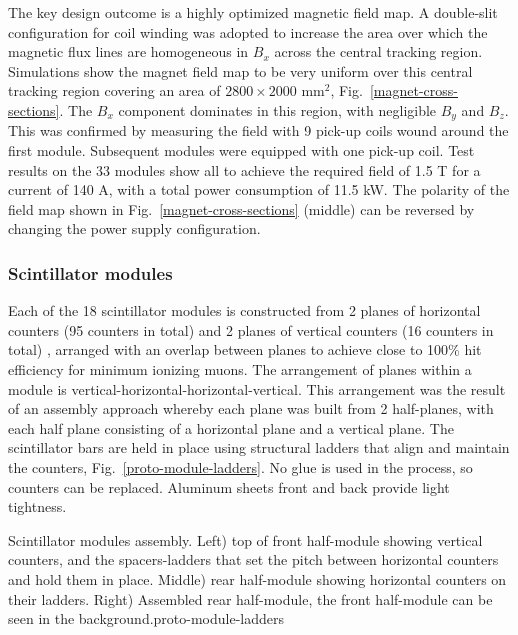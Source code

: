The key design outcome is a highly optimized magnetic field map. A double-slit configuration for coil winding was adopted to increase the area over which the magnetic flux lines are homogeneous in $B_x$ across the central tracking region. Simulations show the magnet field map to be very uniform over this central tracking region covering an area of $2800\times2000$ mm$^2$, Fig.~\ref{magnet-cross-sections}. The $B_x$ component dominates in this region, with negligible $B_y$ and $B_z$. This was confirmed by measuring the field with 9 pick-up coils wound around the first module. Subsequent modules were equipped with one pick-up coil. Test results on the 33 modules show all to achieve the required field of 1.5 T for a current of 140 A, with a total power consumption of 11.5 kW. The polarity of the field map shown in Fig.~\ref{magnet-cross-sections} (middle) can be reversed by changing the power supply configuration.

\subsubsection{Scintillator modules}
Each of the 18 scintillator modules is constructed from 2 planes of horizontal counters (95 counters in total) and 2 planes of vertical counters (16 counters in total) \cite{Antonova:2017tuf}, arranged with an overlap between planes to achieve close to 100\% hit efficiency for minimum ionizing muons. The arrangement of planes within a module is vertical-horizontal-horizontal-vertical. This arrangement was the result of an assembly approach whereby each plane was built from 2 half-planes, with each half plane consisting of a horizontal plane and a vertical plane.
The scintillator bars are held in place using structural ladders that align and maintain the counters, Fig.~\ref{proto-module-ladders}. No glue is used in the process, so counters can be replaced. Aluminum sheets front and back provide light tightness.

 {Scintillator modules assembly. Left) top of front half-module showing vertical counters, and the spacers-ladders that set the pitch between horizontal counters and hold them in place. Middle) rear half-module showing horizontal counters on their ladders. Right) Assembled rear half-module, the front half-module can be seen in the background.}{proto-module-ladders}

